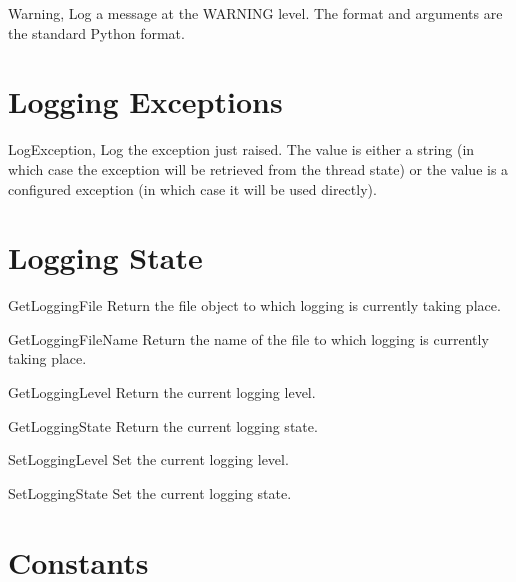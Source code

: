 \documentclass{manual}
\begin{document}
\begin{funcdesc}{Warning}{, }
  Log a message at the WARNING level. The format and arguments are the standard
  Python format.
\end{funcdesc}


\section{Logging Exceptions \label{pyLogExceptions}}

\begin{funcdesc}{LogException}{,
    }
  Log the exception just raised. The value is either a string (in which case
  the exception will be retrieved from the thread state) or the value is a
  configured exception (in which case it will be used directly).
\end{funcdesc}


\section{Logging State \label{pyLoggingState}}

\begin{funcdesc}{GetLoggingFile}{}
  Return the file object to which logging is currently taking place.
\end{funcdesc}

\begin{funcdesc}{GetLoggingFileName}{}
  Return the name of the file to which logging is currently taking place.
\end{funcdesc}

\begin{funcdesc}{GetLoggingLevel}{}
  Return the current logging level.
\end{funcdesc}

\begin{funcdesc}{GetLoggingState}{}
  Return the current logging state.
\end{funcdesc}

\begin{funcdesc}{SetLoggingLevel}{}
  Set the current logging level.
\end{funcdesc}

\begin{funcdesc}{SetLoggingState}{}
  Set the current logging state.
\end{funcdesc}

\section{Constants}
\end{document}
